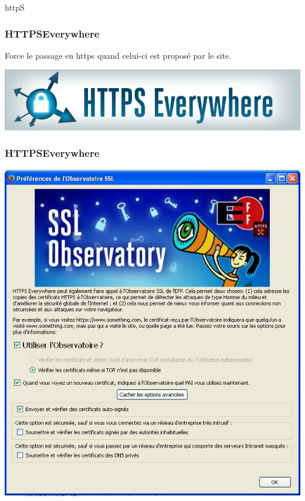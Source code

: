 \documentclass{beamer}
\begin{document}
\begin{frame}
\begin{center}
\Huge{httpS}
\end{center}
\end{frame}

\begin{frame}
\frametitle{HTTPSEverywhere}
Force le passage en https quand celui-ci est proposé par le site.
\begin{center}
\includegraphics[scale=0.4] {./images/https-everywhere.jpg}
\end{center}
\end{frame}

\begin{frame}
\frametitle{HTTPSEverywhere}
\begin{center}
\includegraphics[scale=0.4] {./images/Https_SSL_Observatory.jpg}
\end{center}
\end{frame}
\end{document}
